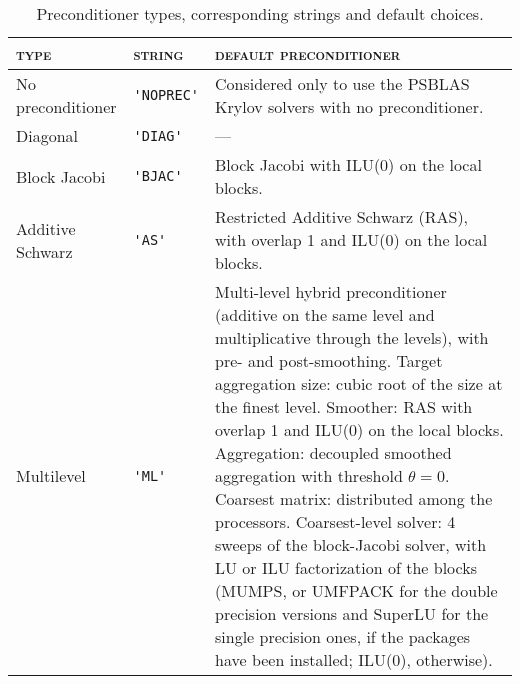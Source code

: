 

\begin{table}[th]
\begin{center}
\begin{tabular}{|l|l|p{7.8cm}|}
\hline
\textsc{type}       & \textsc{string} & \textsc{default preconditioner} \\ \hline
No preconditioner &\verb|'NOPREC'|& Considered only to use the PSBLAS
                                    Krylov solvers with no preconditioner. \\ \hline
Diagonal          & \verb|'DIAG'| & --- \\ \hline
Block Jacobi      & \verb|'BJAC'| & Block Jacobi with ILU(0) on the local blocks.\\ \hline
Additive Schwarz  & \verb|'AS'|   & Restricted Additive Schwarz (RAS),
                                    with overlap 1 and ILU(0) on the local blocks. \\ \hline
Multilevel        &\verb|'ML'|    & Multi-level hybrid preconditioner (additive on the
                                    same level and multiplicative through the levels),
                                    with pre- and post-smoothing.
                                    Target aggregation size: cubic
                                    root of the size at the finest
                                    level. Smoother: RAS with overlap 1 and ILU(0)
                                    on the local blocks.
                                    Aggregation: decoupled smoothed aggregation with
                                    threshold $\theta = 0$.
                                    Coarsest matrix: distributed among the processors.
                                    Coarsest-level solver: 
                                    4 sweeps of the block-Jacobi solver, 
                                    with LU or ILU factorization of the blocks
                                    (MUMPS, or UMFPACK for the double precision versions and
                                    SuperLU for the single precision ones, if the packages
                                    have been installed; ILU(0), otherwise).         \\
\hline
\end{tabular}
\end{center}

\caption{Preconditioner types, corresponding strings and default choices.
\label{tab:precinit}}
\end{table}

